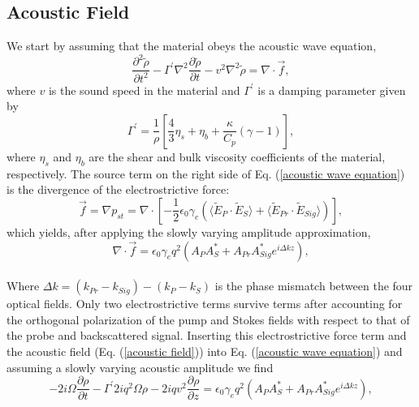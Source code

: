 \documentclass[pdflatex,iicol]{sn-jnl}%
\begin{document}
\subsection{Acoustic Field}
We start by assuming that the material obeys the acoustic wave equation,
\begin{equation}
    \frac{\partial^{2}\tilde{\rho}}{\partial t^{2}} - \Gamma^{\prime}\nabla^{2}\frac{\partial\tilde{\rho}}{\partial t} - v^{2}\nabla^{2}\tilde{\rho} = \nabla\cdot\vec{f},
    \label{acoustic wave equation}
\end{equation}
\noindent where $v$ is the sound speed in the material and $\Gamma^{\prime}$ is a damping parameter given by
\begin{equation}
    \Gamma^{\prime} = \frac{1}{\rho}\left[\frac{4}{3}\eta_{s} + \eta_{b} + \frac{\kappa}{C_{p}}(\gamma - 1)\right],
\end{equation}
\noindent where $\eta_{s}$ and $\eta_{b}$ are the shear and bulk viscosity coefficients of the material, respectively. The source term on the right side of Eq. (\ref{acoustic wave equation}) is the divergence of the electrostrictive force:
\begin{equation}
    \vec{f} = \nabla p_{st} = \nabla \cdot \left[-\frac{1}{2}\epsilon_{0}\gamma_{e}\left(\langle\tilde{E}_{P} \cdot \tilde{E}_{S}\rangle + \langle\tilde{E}_{Pr} \cdot \tilde{E}_{Sig}\rangle\right)\right],
\end{equation}
which yields, after applying the slowly varying amplitude approximation,
\begin{equation}
    \nabla\cdot\vec{f} = \epsilon_{0}\gamma_{e}q^{2}(A_{P}A_{S}^{*} + A_{Pr}A_{Sig}^{*}e^{i\Delta kz}),
\end{equation}
\\
Where $\Delta k = (k_{Pr} - k_{Sig}) - (k_{P} - k_{S})$ is the phase mismatch between the four optical fields. Only two electrostrictive terms survive terms after accounting for the orthogonal polarization of the pump and Stokes fields with respect to that of the probe and backscattered signal. Inserting this electrostrictive force term and the acoustic field (Eq. (\ref{acoustic field})) into Eq. (\ref{acoustic wave equation}) and assuming a slowly varying acoustic amplitude we find
\begin{equation}
    -2i\Omega\frac{\partial\rho}{\partial t} - \Gamma^{\prime}2iq^{2}\Omega\rho - 2iqv^{2}\frac{\partial\rho}{\partial z} = \epsilon_{0}\gamma_{e}q^{2}(A_{P}A_{S}^{*} + A_{Pr}A_{Sig}^{*}e^{i\Delta kz}),
\end{equation}
\end{document}
